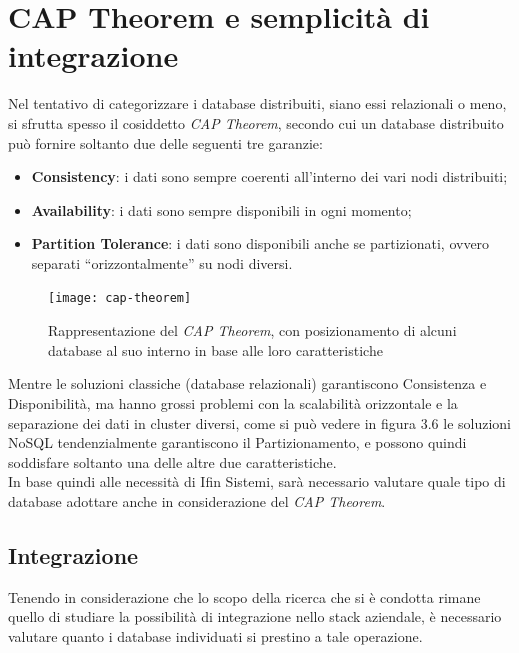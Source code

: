\section{CAP Theorem e semplicità di integrazione}
\label{sec:cap-theorem-integrazione}

Nel tentativo di categorizzare i database distribuiti, siano essi relazionali o meno, si sfrutta spesso il cosiddetto \textit{CAP Theorem}\cite{site:captheorem}, secondo cui un database distribuito può fornire soltanto due delle seguenti tre garanzie:
\begin{itemize}
    \item \textbf{Consistency}: i dati sono sempre coerenti all'interno dei vari nodi distribuiti;
    \item \textbf{Availability}: i dati sono sempre disponibili in ogni momento;
    \item \textbf{Partition Tolerance}: i dati sono disponibili anche se partizionati, ovvero separati ``orizzontalmente'' su nodi diversi.
\end{itemize}

\vspace{10pt}
\begin{figure}[htbp]
\begin{center}
\texttt{[image: cap-theorem]}
\caption{Rappresentazione del \textit{CAP Theorem}, con posizionamento di alcuni database al suo interno in base alle loro caratteristiche}
\end{center}
\end{figure}
\vspace{10pt} 

\noindent Mentre le soluzioni classiche (database relazionali) garantiscono Consistenza e Disponibilità, ma hanno grossi problemi con la scalabilità orizzontale e la separazione dei dati in cluster diversi, come si può vedere in figura 3.6 le soluzioni NoSQL tendenzialmente garantiscono il Partizionamento, e possono quindi soddisfare soltanto una delle altre due caratteristiche.\\

\noindent In base quindi alle necessità di Ifin Sistemi, sarà necessario valutare quale tipo di database adottare anche in considerazione del \textit{CAP Theorem}.

\subsection{Integrazione}
Tenendo in considerazione che lo scopo della ricerca che si è condotta rimane quello di studiare la possibilità di integrazione nello stack aziendale, è necessario valutare quanto i database individuati si prestino a tale operazione.\\

